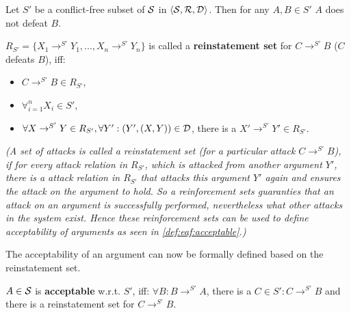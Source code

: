 \begin{lemma}
Let $S'$ be a conflict-free subset of $\S$ in $\langle \S, \R, \D \rangle$. Then for any $A, B \in S'$ $A$ does not defeat $B$.
\end{lemma}

\begin{definition}
$R_{S'} = \{X_1 \rightarrow^{S'} Y_1, ..., 	X_n \rightarrow^{S'} Y_n\}$ is called a \textbf{reinstatement set} for $C \rightarrow^{S'} B$ ($C$ defeats $B$), iff:
\begin{itemize}
	\item $C \rightarrow^{S'} B \in R_{S'}$,
	\item $\forall_{i=1}^n X_i \in S'$,
	\item $\forall X \rightarrow^{S'} Y \in R_{S'}, \forall Y': (Y', (X, Y)) \in \D$, there is a $X' \rightarrow^{S'} Y' \in R_{S'}$.
\end{itemize}
\textit{(A set of attacks is called a reinstatement set (for a particular attack $C \rightarrow^{S'} B$), if for every attack relation in $R_{S'}$, which is attacked from another argument $Y'$, there is a attack relation in $R_{S'}$ that attacks this argument $Y'$ again and ensures the attack on the argument to hold. So a reinforcement sets guaranties that an attack on an argument is successfully performed, nevertheless what other attacks in the system exist. Hence these reinforcement sets can be used to define acceptability of arguments as seen in \autoref{def:eaf:acceptable}.)}
\end{definition}

The acceptability of an argument can now be formally defined based on the reinstatement set.

\begin{definition}
\label{def:eaf:acceptable}
$A \in \S$ is \textbf{acceptable} w.r.t.	 $S'$, iff: $\forall B: B \rightarrow^{S'} A$, there is a $C \in S': C \rightarrow^{S'} B$ and there is a reinstatement set for $C \rightarrow^{S'} B$.
\end{definition}


